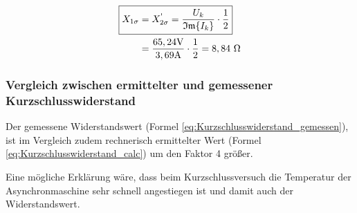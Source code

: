 \documentclass[conference]{IEEEtran}
\begin{document}
\begin{align} \label{eq:Streureaktanzen_solved}
    \Aboxed{X_{1\sigma} & = X_{2\sigma}^\text{\textquotesingle} = \frac{U_k}{\mathfrak{Im}\{I_k\}}\cdot\frac{1}{2}} \\
                        & = \frac{65,24\si{V}}{3,69\si{A}}\cdot\frac{1}{2} = 8,84\ \Omega
\end{align}

\subsubsection{Vergleich zwischen ermittelter und gemessener Kurzschlusswiderstand}

Der gemessene Widerstandswert (Formel \ref{eq:Kurzschlusswiderstand_gemessen}),
ist im Vergleich zudem rechnerisch ermittelter Wert (Formel \ref{eq:Kurzschlusswiderstand_calc}) um den Faktor 4 größer.

Eine mögliche Erklärung wäre, dass beim Kurzschlussversuch die Temperatur der
Asynchronmaschine sehr schnell angestiegen ist und damit auch der Widerstandswert.
\end{document}
